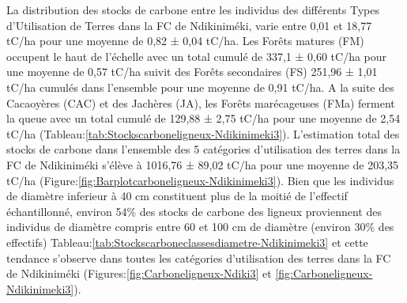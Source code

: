 \documentclass[
  12pt,
  a4paper,
  extrafontsizes,
  onecolumn,
  openright]{book}
\theoremstyle{definition}
\theoremstyle{definition}
\theoremstyle{definition}
\theoremstyle{definition}
\theoremstyle{remark}
\begin{document}
La distribution des stocks de carbone entre les individus des différents Types d'Utilisation de Terres dans la FC de Ndikiniméki, varie entre 0,01 et 18,77 tC/ha pour une moyenne de 0,82 ± 0,04 tC/ha. Les Forêts matures (FM) occupent le haut de l'échelle avec un total cumulé de 337,1 ± 0,60 tC/ha pour une moyenne de 0,57 tC/ha suivit des Forêts secondaires (FS) 251,96 ± 1,01 tC/ha cumulés dans l'ensemble pour une moyenne de 0,91 tC/ha. A la suite des Cacaoyères (CAC) et des Jachères (JA), les Forêts marécageuses (FMa) ferment la queue avec un total cumulé de 129,88 ± 2,75 tC/ha pour une moyenne de 2,54 tC/ha (Tableau:\ref{tab:Stockscarboneligneux-Ndikinimeki3}). L'estimation total des stocks de carbone dans l'ensemble des 5 catégories d'utilisation des terres dans la FC de Ndikiniméki s'élève à 1016,76 ± 89,02 tC/ha pour une moyenne de 203,35 tC/ha (Figure:\ref{fig:Barplotcarboneligneux-Ndikinimeki3}). Bien que les individus de diamètre inferieur à 40 cm constituent plus de la moitié de l'effectif échantillonné, environ 54\% des stocks de carbone des ligneux proviennent des individus de diamètre compris entre 60 et 100 cm de diamètre (environ 30\% des effectifs) Tableau:\ref{tab:Stockscarboneclassesdiametre-Ndikinimeki3} et cette tendance s'observe dans toutes les catégories d'utilisation des terres dans la FC de Ndikiniméki (Figures:\ref{fig:Carboneligneux-Ndiki3} et \ref{fig:Carboneligneux-Ndikinimeki3}).

\begin{table}
\centering
\caption{\label{tab:Stockscarboneligneux-Ndikinimeki3}Stocks de carbone des ligneux dans les différentes catégories d'utilisation de terres dans la FC de Ndikiniméki.}
\centering
{}
\end{table}
\end{document}
